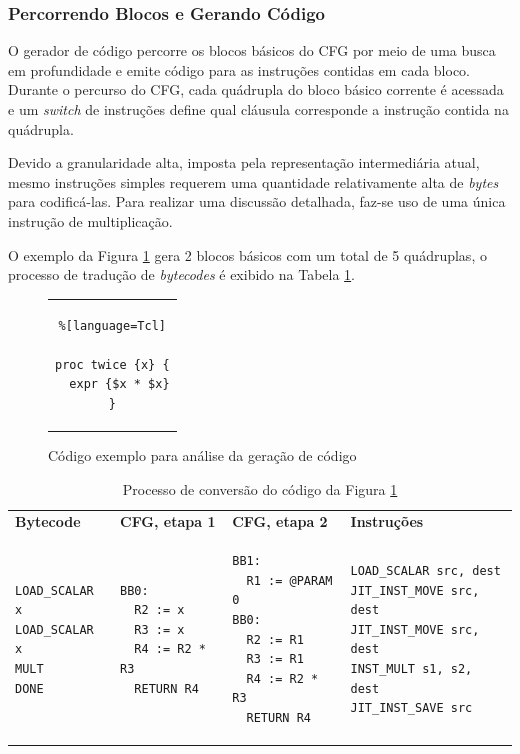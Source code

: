 \subsubsection{Percorrendo Blocos e Gerando Código}

O gerador de código percorre os blocos básicos do CFG por meio de uma
busca em profundidade e emite código para as instruções contidas em
cada bloco. Durante o percurso do CFG, cada quádrupla
do bloco básico corrente é acessada e um
\textit{switch} de instruções define qual cláusula corresponde a
instrução contida na quádrupla.

Devido a granularidade alta, imposta pela representação intermediária
atual, mesmo instruções simples requerem uma quantidade
relativamente alta de \textit{bytes} para codificá-las. Para realizar
uma discussão detalhada, faz-se uso de uma única instrução de
multiplicação.

O exemplo da Figura \ref{myinc} gera 2 blocos básicos com um total de 5
quádruplas, o processo de tradução de \textit{bytecodes} é exibido na
Tabela \ref{tabela-processo}.

\begin{figure}[ht!]
  \centering
  \begin{tabular}{c}
    \begin{lstlisting}%[language=Tcl]

proc twice {x} {
  expr {$x * $x}
}
    \end{lstlisting}
  \end{tabular}
  \caption{Código exemplo para análise da geração de código \label{myinc}}
\end{figure}

\begin{table}[ht!]
  \centering
  \caption{Processo de conversão do código da Figura \ref{myinc} \label{tabela-processo}}
  \begin{tabular}{| p{2.8cm} | p{3.3cm} | p{3.4cm} | p{5cm} |}
    \hline
    \bf{Bytecode} & \bf{CFG, etapa 1} & \bf{CFG, etapa 2} & \bf{Instruções}\\
\begin{verbatim}
LOAD_SCALAR x
LOAD_SCALAR x
MULT
DONE
\end{verbatim} &
\begin{verbatim}
BB0:
  R2 := x
  R3 := x
  R4 := R2 * R3
  RETURN R4
\end{verbatim} &
\begin{verbatim}
BB1:
  R1 := @PARAM 0
BB0:
  R2 := R1
  R3 := R1
  R4 := R2 * R3
  RETURN R4
\end{verbatim} &
\begin{verbatim}
LOAD_SCALAR src, dest
JIT_INST_MOVE src, dest
JIT_INST_MOVE src, dest
INST_MULT s1, s2, dest
JIT_INST_SAVE src
\end{verbatim} \\
    \hline
  \end{tabular}
\end{table}

